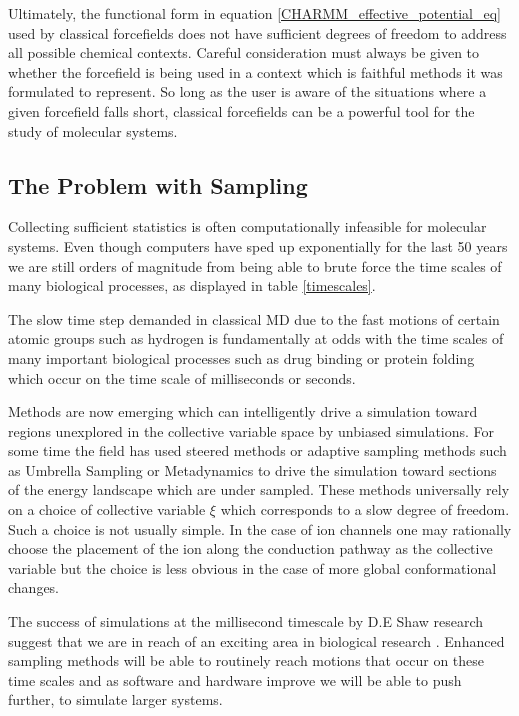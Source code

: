 Ultimately, the functional form in equation \ref{CHARMM_effective_potential_eq} used by classical forcefields does not have sufficient degrees of freedom to address all possible chemical contexts. Careful consideration must always be given to whether the forcefield is being used in a context which is faithful methods it was formulated to represent. So long as the user is aware of the situations where a given forcefield falls short, classical forcefields can be a powerful tool for the study of molecular systems.

\subsection{The Problem with Sampling}
\label{sampling_problem}

Collecting sufficient statistics is often computationally infeasible for molecular systems. Even though computers have sped up exponentially for the last 50 years we are still orders of magnitude from being able to brute force the time scales of many biological processes, as displayed in table \ref{timescales}.

The slow time step demanded in classical MD due to the fast motions of certain atomic groups such as hydrogen is fundamentally at odds with the time scales of many important biological processes such as drug binding or protein folding which occur on the time scale of milliseconds or seconds.  

Methods are now emerging which can intelligently drive a simulation toward regions unexplored in the collective variable space by unbiased simulations. For some time the field has used steered methods or adaptive sampling methods such as Umbrella Sampling or Metadynamics to drive the simulation toward sections of the energy landscape which are under sampled. These methods universally rely on a choice of collective variable $\xi$ which corresponds to a slow degree of freedom. Such a choice is not usually simple. In the case of ion channels one may rationally choose the placement of the ion along the conduction pathway as the collective variable but the choice is less obvious in the case of more global conformational changes.

The success of simulations at the millisecond timescale by D.E Shaw research suggest that we are in reach of an exciting area in biological research \cite{lindorff-larsen2016, robustelli2022}. Enhanced sampling methods will be able to routinely reach motions that occur on these time scales and as software and hardware improve we will be able to push further, to simulate larger systems. 

